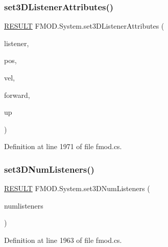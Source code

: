 \subsubsection{\texorpdfstring{set3\+D\+Listener\+Attributes()}{set3DListenerAttributes()}}
{\footnotesize\ttfamily \hyperlink{namespace_f_m_o_d_a305d1176ef3f8c8815861a60407ac33d}{R\+E\+S\+U\+LT} F\+M\+O\+D.\+System.\+set3\+D\+Listener\+Attributes (\begin{DoxyParamCaption}\item[{int}]{listener,  }\item[{ref \hyperlink{struct_f_m_o_d_1_1_v_e_c_t_o_r}{V\+E\+C\+T\+OR}}]{pos,  }\item[{ref \hyperlink{struct_f_m_o_d_1_1_v_e_c_t_o_r}{V\+E\+C\+T\+OR}}]{vel,  }\item[{ref \hyperlink{struct_f_m_o_d_1_1_v_e_c_t_o_r}{V\+E\+C\+T\+OR}}]{forward,  }\item[{ref \hyperlink{struct_f_m_o_d_1_1_v_e_c_t_o_r}{V\+E\+C\+T\+OR}}]{up }\end{DoxyParamCaption})}



Definition at line 1971 of file fmod.\+cs.

\mbox{\label{class_f_m_o_d_1_1_system_a243d0b61050df5d94b2d5ecc92b6e08e}} 
\subsubsection{\texorpdfstring{set3\+D\+Num\+Listeners()}{set3DNumListeners()}}
{\footnotesize\ttfamily \hyperlink{namespace_f_m_o_d_a305d1176ef3f8c8815861a60407ac33d}{R\+E\+S\+U\+LT} F\+M\+O\+D.\+System.\+set3\+D\+Num\+Listeners (\begin{DoxyParamCaption}\item[{int}]{numlisteners }\end{DoxyParamCaption})}



Definition at line 1963 of file fmod.\+cs.

\mbox{\label{class_f_m_o_d_1_1_system_a9bc9ee43ccce64e90626067723534f6b}} 
